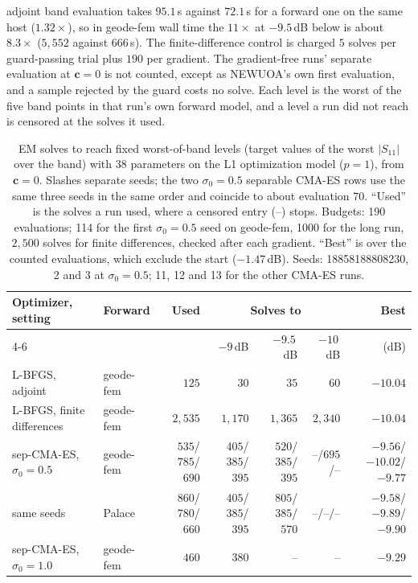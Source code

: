 \documentclass{anvil-paper}
\begin{document}
adjoint band evaluation takes $95.1$\,s against $72.1$\,s for a forward one on
the same host ($1.32\times$), so in geode-fem wall time the $11\times$ at
$-9.5$\,dB below is about $8.3\times$ ($5{,}552$ against $666$\,s). The
finite-difference control is
charged $5$ solves per guard-passing trial plus $190$ per gradient. The
gradient-free runs' separate evaluation at $\mathbf{c} = 0$ is not counted,
except as NEWUOA's own first evaluation, and a sample rejected by the guard
costs no solve. Each level is the worst of the five band points in that
run's own forward model, and a level a run did not reach is censored at the
solves it used.
\begin{table}[t]
  \centering
  \caption{EM solves to reach fixed worst-of-band levels (target values of the
  worst $|S_{11}|$ over the band) with 38 parameters on the L1
  optimization model ($p = 1$), from $\mathbf{c} = 0$. Slashes separate
  seeds; the two $\sigma_0 = 0.5$ separable CMA-ES rows use the same three
  seeds in the same order and coincide to about evaluation 70. ``Used'' is
  the solves a run used, where a censored entry (--) stops. Budgets: 190
  evaluations; 114 for the first $\sigma_0 = 0.5$ seed on geode-fem, 1000
  for the long run, $2{,}500$ solves for finite differences, checked after
  each gradient. ``Best'' is over the counted evaluations, which exclude the
  start ($-1.47$\,dB). Seeds: 18858188808230, 2 and 3 at $\sigma_0 = 0.5$;
  11, 12 and 13 for the other CMA-ES runs.}
  \label{tab:baselines}
  \footnotesize
  \setlength{\tabcolsep}{3pt}
  \begin{tabular}{@{}l l r r r r r@{}}
    \toprule
    Optimizer, setting & Forward & Used & \multicolumn{3}{c}{Solves to} & Best \\
    \cmidrule(lr){4-6}
    & & & $-9$\,dB & $-9.5$\,dB & $-10$\,dB & (dB) \\
    \midrule
    L-BFGS, adjoint & geode-fem & $125$ & $30$ & $35$ & $60$ & $-10.04$ \\
    L-BFGS, finite differences & geode-fem & $2{,}535$ & $1{,}170$ & $1{,}365$ & $2{,}340$ & $-10.04$ \\
    \midrule
    sep-CMA-ES, $\sigma_0 = 0.5$ & geode-fem & $535$/$785$/$690$ & $405$/$385$/$395$ & $520$/$385$/$395$ & --/$695$/-- & $-9.56$/$-10.02$/$-9.77$ \\
    \quad same seeds & Palace & $860$/$780$/$660$ & $405$/$385$/$395$ & $805$/$385$/$570$ & --/--/-- & $-9.58$/$-9.89$/$-9.90$ \\
    sep-CMA-ES, $\sigma_0 = 1.0$ & geode-fem & $460$ & $380$ & -- & -- & $-9.29$ \\

\end{tabular}
\end{table}
\end{document}
